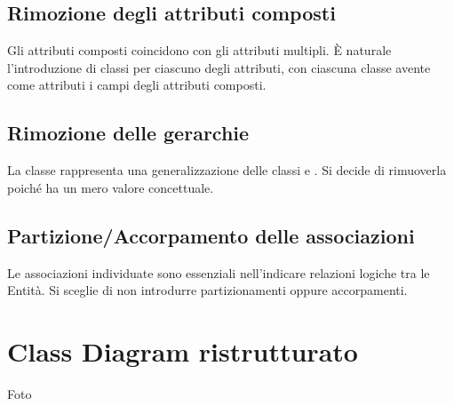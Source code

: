 \subsection{Rimozione degli attributi composti}
Gli attributi composti coincidono con gli attributi multipli. È naturale l'introduzione di classi per ciascuno degli attributi, con ciascuna classe avente come attributi i campi degli attributi composti. 
\subsection{Rimozione delle gerarchie}
La classe \Elemento rappresenta una generalizzazione delle classi \Contatto e \Gruppo. Si decide di rimuoverla poiché ha un mero valore concettuale.
\subsection{Partizione/Accorpamento delle associazioni}
Le associazioni individuate sono essenziali nell'indicare relazioni logiche tra le Entità. Si sceglie di non introdurre partizionamenti oppure accorpamenti.
\section{Class Diagram ristrutturato}
{\Huge Foto}
\clearpage        
